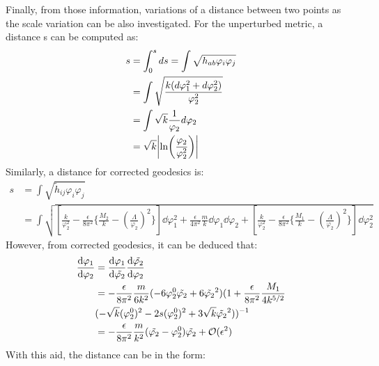 Finally, from those information, variations of a distance between two points as the scale variation can be also investigated. For the unperturbed metric, a distance s can be computed as:
\begin{align}
    s &= \int _{0}^{s} ds = \int \sqrt{h_{ab} \varphi_{i}\varphi_{j}} \nonumber \\
    &= \int \sqrt{\frac{k(d\varphi_{1}^{2} + d\varphi_{2}^{2})}{\varphi_{2}^{2}}} \nonumber \\
    &= \int \sqrt{k}\frac{1}{\varphi_{2}}d\varphi_{2} \nonumber \\
    & = \sqrt{k} \abs{\ln(\frac{\varphi_{2}}{\varphi_{2}^{2}})}
\end{align}
Similarly, a distance for corrected geodesics is:
\begin{align}
    s &= \int \sqrt{\tilde h_{ij} \varphi_{i} \varphi_{j}} \nonumber \\
    &= \int \sqrt{[\frac{k}{\varphi_{2}^{2}} -\frac{\epsilon}{8\pi^{2}}\lbrace \frac{M_2}{k} - (\frac{\Lambda}{\varphi_{2}})^{2}\rbrace ]\dd \varphi_{1}^{2} + \frac{\epsilon}{4\pi^{2}} \frac{m}{k}\dd \varphi_{1} \dd \varphi_{2} +[\frac{k}{\varphi_{2}^{2}} -\frac{\epsilon}{8\pi^{2}}\lbrace \frac{M_1}{k} - (\frac{\Lambda}{\varphi_{2}})^{2}\rbrace ] \dd \varphi_{2}^{2} } \nonumber
\end{align}
However, from corrected geodesics, it can be deduced that:
\begin{align} 
    \begin{split}
    \dv{\varphi_{1}}{\varphi_{2}} &= \dv{\varphi_{1}}{\tilde{\varphi_{2}}}\dv{\tilde{\varphi_{2}}}{\varphi_{2}}  \\
    &= -\frac{\epsilon}{8\pi^{2}}\frac{m}{6k^{2}} (-6\varphi_{2}^{0} \tilde{\varphi_{2}} + 6 \tilde{\varphi_{2}}^{2})(1+\frac{\epsilon}{8\pi^{2}} \frac{M_{1}}{4k^{5/2}} \\
    & (-\sqrt{k}(\varphi_{2}^{0} )^{2} - 2s(\varphi_{2}^{0}) ^{2} + 3\sqrt{k} \tilde{\varphi_{2}}^{2}))^{-1}  \\
    &= -\frac{\epsilon}{8\pi^{2}}\frac{m}{k^{2}} (\tilde{\varphi_{2}} - \varphi_{2}^{0})\tilde{\varphi_{2}} + \mathcal{O}(\epsilon ^{2})
    \end{split}
\end{align}
With this aid, the distance can be in the form:
